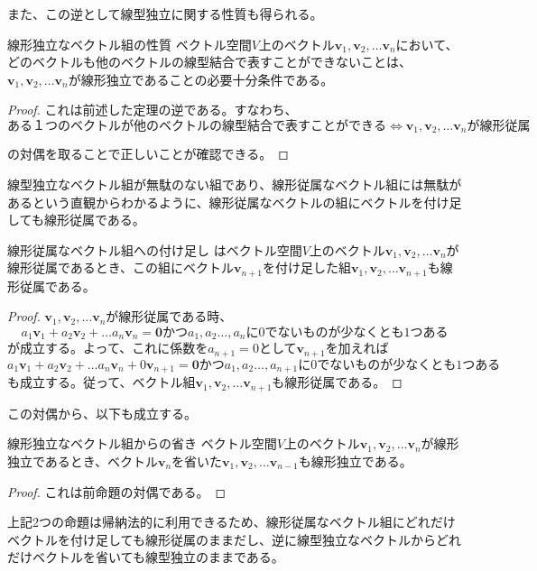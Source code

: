 また、この逆として線型独立に関する性質も得られる。
\begin{theorem*}{線形独立なベクトル組の性質}
	ベクトル空間\(V\)上のベクトル\(\boldsymbol{v}_1,\boldsymbol{v}_2,\dots\boldsymbol{v}_n\)において、どのベクトルも他のベクトルの線型結合で表すことができないことは、\(\boldsymbol{v}_1,\boldsymbol{v}_2,\dots\boldsymbol{v}_n\)が線形独立であることの必要十分条件である。
\end{theorem*}
\begin{proof}
	これは前述した定理の逆である。すなわち、
	\begin{equation}
		ある１つのベクトルが他のベクトルの線型結合で表すことができる
		\iff
		\boldsymbol{v}_1,\boldsymbol{v}_2,\dots\boldsymbol{v}_nが線形従属
	\end{equation}

	の対偶を取ることで正しいことが確認できる。
\end{proof}
線型独立なベクトル組が無駄のない組であり、線形従属なベクトル組には無駄があるという直観からわかるように、線形従属なベクトルの組にベクトルを付け足しても線形従属である。
\begin{theorem*}{線形従属なベクトル組への付け足し}
	はベクトル空間\(V\)上のベクトル\(\boldsymbol{v}_1,\boldsymbol{v}_2,\dots\boldsymbol{v}_n\)が線形従属であるとき、この組にベクトル\(\boldsymbol{v}_{n+1}\)を付け足した組\(\boldsymbol{v}_1,\boldsymbol{v}_2,\dots\boldsymbol{v}_{n+1}\)も線形従属である。
\end{theorem*}
\begin{proof}
	\(\boldsymbol{v}_1,\boldsymbol{v}_2,\dots\boldsymbol{v}_n\)が線形従属である時、
	\begin{equation}
		a_1\boldsymbol{v}_1+a_2\boldsymbol{v}_2+\dots a_n\boldsymbol{v}_n  =\boldsymbol{0} かつ a_1,a_2\dots,a_nに0でないものが少なくとも1つある
	\end{equation}
	が成立する。よって、これに係数を\(a_{n+1}=0\)として\(\boldsymbol{v}_{n+1}\)を加えれば
	\begin{equation}
		a_1\boldsymbol{v}_1+a_2\boldsymbol{v}_2+\dots a_n\boldsymbol{v}_n +0\boldsymbol{v}_{n+1} =\boldsymbol{0} かつ a_1,a_2\dots,a_{n+1}に0でないものが少なくとも1つある
	\end{equation}
	も成立する。従って、ベクトル組\(\boldsymbol{v}_1,\boldsymbol{v}_2,\dots\boldsymbol{v}_{n+1}\)も線形従属である。
\end{proof}
この対偶から、以下も成立する。
\begin{theorem*}{線形独立なベクトル組からの省き}
	ベクトル空間\(V\)上のベクトル\(\boldsymbol{v}_1,\boldsymbol{v}_2,\dots\boldsymbol{v}_n\)が線形独立であるとき、ベクトル\(\boldsymbol{v}_{n}\)を省いた\(\boldsymbol{v}_1,\boldsymbol{v}_2,\dots\boldsymbol{v}_{n-1}\)も線形独立である。
\end{theorem*}
\begin{proof}
	これは前命題の対偶である。
\end{proof}
上記2つの命題は帰納法的に利用できるため、線形従属なベクトル組にどれだけベクトルを付け足しても線形従属のままだし、逆に線型独立なベクトルからどれだけベクトルを省いても線型独立のままである。
